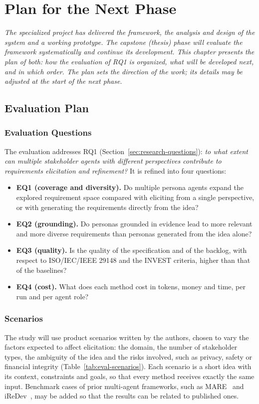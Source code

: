 \chapter{Plan for the Next Phase}
\label{chap:next-phase}
\label{chap:evaluation}
\textit{The specialized project has delivered the framework, the analysis and design of the system and a working prototype. The capstone (thesis) phase will evaluate the framework systematically and continue its development. This chapter presents the plan of both: how the evaluation of RQ1 is organized, what will be developed next, and in which order. The plan sets the direction of the work; its details may be adjusted at the start of the next phase.}

\section{Evaluation Plan}
\label{sec:eval-plan}

\subsection{Evaluation Questions}
\label{sec:eval-rq}
The evaluation addresses RQ1 (Section~\ref{sec:research-questions}): \emph{to what extent can multiple stakeholder agents with different perspectives contribute to requirements elicitation and refinement?} It is refined into four questions:
\begin{itemize}
    \item \textbf{EQ1 (coverage and diversity).} Do multiple persona agents expand the explored requirement space compared with eliciting from a single perspective, or with generating the requirements directly from the idea?
    \item \textbf{EQ2 (grounding).} Do personas grounded in evidence lead to more relevant and more diverse requirements than personas generated from the idea alone?
    \item \textbf{EQ3 (quality).} Is the quality of the specification and of the backlog, with respect to ISO/IEC/IEEE 29148 and the INVEST criteria, higher than that of the baselines?
    \item \textbf{EQ4 (cost).} What does each method cost in tokens, money and time, per run and per agent role?
\end{itemize}

\subsection{Scenarios}
\label{sec:eval-datasets}
The study will use product scenarios written by the authors, chosen to vary the factors expected to affect elicitation: the domain, the number of stakeholder types, the ambiguity of the idea and the risks involved, such as privacy, safety or financial integrity (Table~\ref{tab:eval-scenarios}). Each scenario is a short idea with its context, constraints and goals, so that every method receives exactly the same input. Benchmark cases of prior multi-agent frameworks, such as MARE~\cite{mare2024} and iReDev~\cite{jin2025iredev}, may be added so that the results can be related to published ones.

